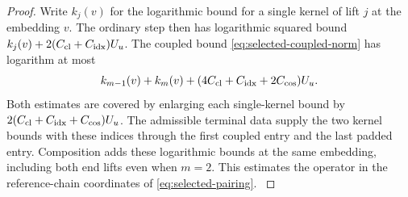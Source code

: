 \begin{proof}
Write \(k_j(v)\) for
the logarithmic bound for a single kernel of lift \(j\)
at the embedding \(v\). The ordinary step then has
logarithmic squared bound
\(k_j(v)+2(C_{\rm cl}+C_{\rm idx})U_u\).
The coupled bound \eqref{eq:selected-coupled-norm} has
logarithm at most
\[
 k_{m-1}(v)+k_m(v)
        +(4C_{\rm cl}+C_{\rm idx}+2C_{\rm cos})U_u .
\]
Both estimates are covered by enlarging each single-kernel
bound by \(2(C_{\rm cl}+C_{\rm idx}+C_{\rm cos})U_u\).
The admissible terminal data supply the two kernel bounds
with these indices through the first coupled entry and the
last padded entry. Composition adds these logarithmic bounds at
the same embedding, including both end lifts even when \(m=2\).
This estimates the operator in the reference-chain coordinates
of \eqref{eq:selected-pairing}.
\label{cor:selected-norms-4}
\end{proof}






